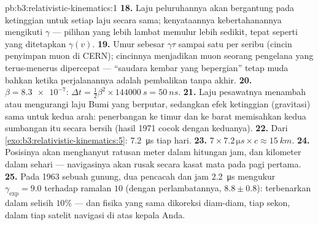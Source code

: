\begin{solution}{pb:b3:relativistic-kinematics:1}
\textbf{18.} Laju peluruhannya akan bergantung pada ketinggian untuk
setiap laju secara sama; kenyataannya kebertahanannya mengikuti $\gamma$
--- pilihan yang lebih lambat memulur lebih sedikit, tepat seperti yang
ditetapkan $\gamma(v)$.
\textbf{19.} Umur sebesar $\gamma\tau$ sampai satu per seribu (cincin
penyimpan muon di CERN); cincinnya menjadikan muon seorang pengelana
yang terus-menerus dipercepat --- ``saudara kembar yang bepergian''
tetap muda bahkan ketika perjalanannya adalah pembalikan tanpa akhir.
\textbf{20.} $\beta = \num{8.3e-7}$: $\Delta t = \tfrac12\beta^2
\times \qty{144000}{s} = \qty{50}{ns}$.
\textbf{21.} Laju pesawatnya menambah atau mengurangi laju Bumi yang
berputar, sedangkan efek ketinggian (gravitasi) sama untuk kedua arah:
penerbangan ke timur dan ke barat memisahkan kedua sumbangan itu secara
bersih (hasil 1971 cocok dengan keduanya).
\textbf{22.} Dari \cref{exo:b3:relativistic-kinematics:5}:
\qty{7.2}{\micro s} tiap hari.
\textbf{23.} $7 \times 7.2\,\unit{\micro s} \times c \approx
\qty{15}{km}.$
\textbf{24.} Posisinya akan menghanyut ratusan meter dalam hitungan
jam, dan kilometer dalam sehari --- navigasinya akan rusak secara kasat
mata pada pagi pertama.
\textbf{25.} Pada 1963 sebuah gunung, dua pencacah dan jam
\qty{2.2}{\micro s} mengukur $\gamma_{\exp} = 9.0$ terhadap ramalan $10$
(dengan perlambatannya, $8.8 \pm 0.8$):  terbenarkan
dalam selisih $10\%$ --- dan fisika yang sama dikoreksi diam-diam, tiap
sekon, dalam tiap satelit navigasi di atas kepala Anda.
\end{solution}
